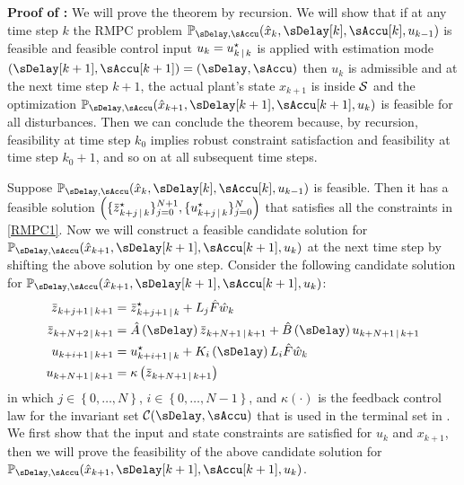 \noindent\textbf{Proof of :}
%
We will prove the theorem by recursion. We will show that if at any
time step $k$ the RMPC problem $\MPCProb{\sDelay,\sAccu}(\hat{x}_{k},\sDelay[k],\sAccu[k],u_{k-1})$
is feasible and feasible control input $u_{k}=u_{k\,|\, k}^{\star}$
is applied with estimation mode $\left(\sDelay[k+1],\sAccu[k+1]\right)=\left(\sDelay,\sAccu\right)$
then $u_{k}$ is admissible and at the next time step $k+1$, the
actual plant's state $x_{k+1}$ is inside $\mathcal{S}$ and the optimization
$\MPCProb{\sDelay,\sAccu}(\hat{x}_{k+1},\sDelay[k+1],\sAccu[k+1],u_{k})$
is feasible for all disturbances. Then we can conclude the theorem
because, by recursion, feasibility at time step $k_{0}$ implies robust
constraint satisfaction and feasibility at time step $k_{0}+1$, and
so on at all subsequent time steps.

Suppose $\MPCProb{\sDelay,\sAccu}(\hat{x}_{k},\sDelay[k],\sAccu[k],u_{k-1})$
is feasible. Then it has a feasible solution $\left(\{ \overbar{z}_{k+j\Given k}^{\star}\} _{j=0}^{N+1},\{ u_{k+j\Given k}^{\star}\} _{j=0}^{N}\right)$
that satisfies all the constraints in \eqref{RMPC1}. Now we will
construct a feasible candidate solution for $\MPCProb{\sDelay,\sAccu}(\hat{x}_{k+1},\sDelay[k+1],\sAccu[k+1],u_{k})$
at the next time step by shifting the above solution by one step.
Consider the following candidate solution for $\MPCProb{\sDelay,\sAccu}(\hat{x}_{k+1},\sDelay[k+1],\sAccu[k+1],u_{k})$:
\begin{subequations}
\label{eq:proofs:candidate-solution}
\begin{align}
\Nom z_{k+j+1\Given k+1} & =\Nom z_{k+j+1\Given k}^{\star}+L_{j}\hat{F}\hat{w}_{k}\label{eq:proofs:candidate-solution:zj}\\
\Nom z_{k+N+2\Given k+1} & =\hat{A}\left(\sDelay\right)\Nom z_{k+N+1\Given k+1}+\hat{B}\left(\sDelay\right)u_{k+N+1\Given k+1}\label{eq:proofs:candidate-solution:zN}\\
u_{k+i+1\Given k+1} & =u_{k+i+1\Given k}^{\star}+K_{i}\left(\sDelay\right)L_{i}\hat{F}\hat{w}_{k}\label{eq:proofs:candidate-solution:uj}\\
u_{k+N+1\Given k+1} & =\kappa\left(\Nom z_{k+N+1\Given k+1}\right)\label{eq:proofs:candidate-solution:uN}
\end{align}
\end{subequations} in which
$j\in\left\{ 0,\dots,N\right\} $, $i\in\left\{ 0,\dots,N-1\right\} $,
and $\kappa\left(\cdot\right)$ is the feedback control law for the
invariant set $\CCC(\sDelay,\sAccu)$ that is used in the terminal
set in . We first show that the input and
state constraints are satisfied for $u_{k}$ and $x_{k+1}$, then
we will prove the feasibility of the above candidate solution for
$\MPCProb{\sDelay,\sAccu}(\hat{x}_{k+1},\sDelay[k+1],\sAccu[k+1],u_{k})$.


